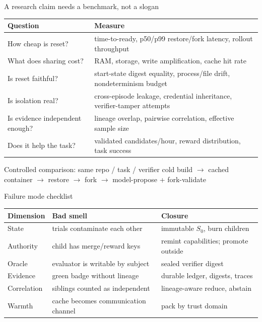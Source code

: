 \begin{frame}{A research claim needs a benchmark, not a slogan}
\footnotesize
\begin{tabular}{p{}p{}}
\toprule
\textbf{Question} & \textbf{Measure} \\
\midrule
How cheap is reset? & time-to-ready, p50/p99 restore/fork latency, rollout throughput \\
What does sharing cost? & RAM, storage, write amplification, cache hit rate \\
Is reset faithful? & start-state digest equality, process/file drift, nondeterminism budget \\
Is isolation real? & cross-episode leakage, credential inheritance, verifier-tamper attempts \\
Is evidence independent enough? & lineage overlap, pairwise correlation, effective sample size \\
Does it help the task? & validated candidates/hour, reward distribution, task success \\
\bottomrule
\end{tabular}

\vspace{0.25em}
\begin{block}{Controlled comparison: same repo / task / verifier}
\centering\scriptsize
cold build $\rightarrow$ cached container $\rightarrow$ restore $\rightarrow$ fork $\rightarrow$ model-propose + fork-validate
\end{block}

\vspace{0.05em}
\centering\normalsize {}
\end{frame}

\begin{frame}{Failure mode checklist}
\small
\begin{tabular}{p{}p{}p{}}
\toprule
\textbf{Dimension} & \textbf{Bad smell} & \textbf{Closure} \\
\midrule
State & trials contaminate each other & immutable $S_0$, burn children \\
Authority & child has merge/reward keys & remint capabilities; promote outside \\
Oracle & evaluator is writable by subject & sealed verifier digest \\
Evidence & green badge without lineage & durable ledger, digests, traces \\
Correlation & siblings counted as independent & lineage-aware reduce, abstain \\
Warmth & cache becomes communication channel & pack by trust domain \\
\bottomrule
\end{tabular}
\end{frame}

